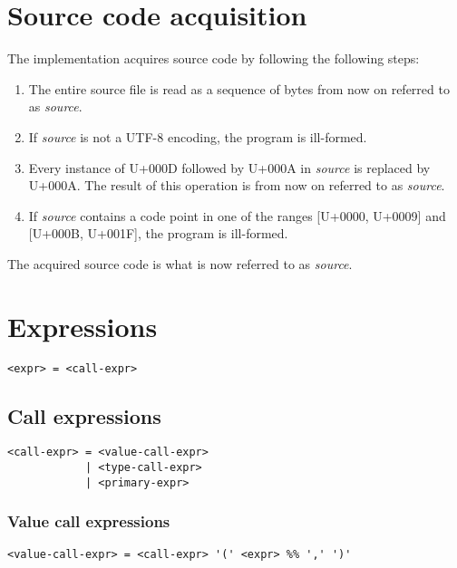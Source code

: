 \documentclass[12pt, oneside]{memoir}
\newcommand{\var}[1]{\emph{#1}}
\newcommand{\cp}[1]{U+#1}
\begin{document}
\chapter{Source code acquisition}

The implementation acquires source code by following the following steps:

\begin{enumerate}
  \item The entire source file is read as a sequence of bytes from now on
        referred to as \var{source}.
  \item If \var{source} is not a UTF-8 encoding, the program is ill-formed.
  \item Every instance of \cp{000D} followed by \cp{000A} in \var{source} is
        replaced by \cp{000A}. The result of this operation is from now on
        referred to as \var{source}.
  \item If \var{source} contains a code point in one of the ranges
        [\cp{0000}, \cp{0009}] and [\cp{000B}, \cp{001F}], the program is
        ill-formed.
\end{enumerate}

The acquired source code is what is now referred to as \var{source}.

\chapter{Expressions}

\begin{verbatim}
<expr> = <call-expr>
\end{verbatim}

\section{Call expressions}

\begin{verbatim}
<call-expr> = <value-call-expr>
            | <type-call-expr>
            | <primary-expr>
\end{verbatim}

\subsection{Value call expressions}

\begin{verbatim}
<value-call-expr> = <call-expr> '(' <expr> %% ',' ')'
\end{verbatim}
\end{document}
